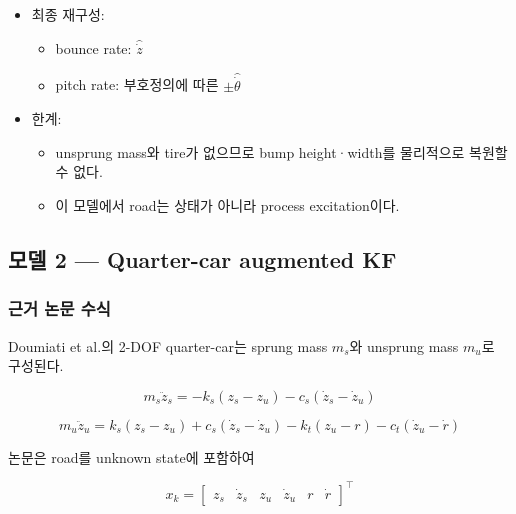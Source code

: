 \documentclass[letterpaper,10pt,journal,twocolumn]{ieeeconf}
\begin{document}
\begin{itemize}
  \begin{itemize}
  
  \item
    \(\omega_z,\zeta_z,\omega_\theta,\zeta_\theta\)
  \item
    \(c_{z\theta},\kappa_a,g_a,g_T,g_{\Delta a}\)
  \item
    \(Q,R\) 또는 그 diagonal scale
  \end{itemize}
\item
  최종 재구성:

  \begin{itemize}
  
  \item
    bounce rate: \(\widehat{\dot z}\)
  \item
    pitch rate: 부호정의에 따른 \(\pm\widehat{\dot\theta}\)
  \end{itemize}
\item
  한계:

  \begin{itemize}
  
  \item
    unsprung mass와 tire가 없으므로 bump height·width를 물리적으로 복원할 수 없다.
  \item
    이 모델에서 road는 상태가 아니라 process excitation이다.
  \end{itemize}
\end{itemize}

\subsection{모델 2 --- Quarter-car augmented KF}

\subsubsection{근거 논문 수식}

Doumiati et al.의 2-DOF quarter-car는 sprung mass \(m_s\)와 unsprung mass \(m_u\)로 구성된다.

\[
m_s\ddot z_s
=
-k_s(z_s-z_u)
-c_s(\dot z_s-\dot z_u)
\]

\[
m_u\ddot z_u
=
k_s(z_s-z_u)
+c_s(\dot z_s-\dot z_u)
-k_t(z_u-r)
-c_t(\dot z_u-\dot r)
\]

논문은 road를 unknown state에 포함하여

\[
x_k
=
\begin{bmatrix}
z_s&
\dot z_s&
z_u&
\dot z_u&
r&
\dot r
\end{bmatrix}^{\top}
\]
\end{document}
